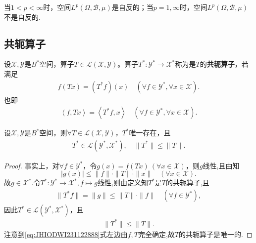 \documentclass[../../main.tex]{subfiles}%
\begin{document}
\begin{examples}
当$1<p<\infty$时，空间$L^p(\Omega,\mathscr{B},\mu)$是自反的；当$p=1,\infty$时，空间$L^p(\Omega,\mathscr{B},\mu)$不是自反的.
\end{examples}


\subsection{共轭算子}

\begin{definition}[共轭算子]
设$\mathscr{X},\mathscr{Y}$是$B^*$空间，算子$T\in\mathscr{L}(\mathscr{X},\mathscr{Y})$。算子$T^*:\mathscr{Y}^*\to\mathscr{X}^*$称为是$T$的\textbf{共轭算子}，若满足
\begin{align}\label{eq:JHIODWI231122888}
f(Tx)=(T^*f)(x)\quad (\forall f\in\mathscr{Y}^*,\forall x\in\mathscr{X}).
\end{align}
也即
\begin{align*}
\left< f,Tx \right> =\left< T^*f,x \right> \quad (\forall f\in \mathscr{Y} ^*,\forall x\in \mathscr{X} ).
\end{align*}
\end{definition}

\begin{proposition}
设$\mathscr{X},\mathscr{Y}$是$B^*$空间，则$\forall T\in\mathscr{L}(\mathscr{X},\mathscr{Y})$，$T^*$唯一存在，且
\begin{align}\label{eq:::HIOUR32s2.5.26}
T^*\in\mathscr{L}(\mathscr{Y}^*,\mathscr{X}^*),\quad \|T^*\|\leqslant\|T\|.
\end{align}
\end{proposition}
\begin{proof}

事实上，对$\forall f\in\mathscr{Y}^*$，令$g(x)=f(Tx)\ (\forall x\in\mathscr{X})$，则$g$线性,且由知
\[
|g(x)|\leqslant\|f\|\cdot\|T\|\cdot\|x\|\quad (\forall x\in\mathscr{X}).
\]
故$g\in\mathscr{X}^*$.令$T^*:\mathscr{Y}^*\to\mathscr{X}^*,f\mapsto g$线性,则由定义知$T^*$是$T$的共轭算子,且
\begin{align}
\|T^*f\|=\|g\|\leqslant\|T\|\cdot\|f\|\quad (\forall f\in\mathscr{Y}^*), \label{eq:::HIOUR32s2.5.25}
\end{align}
因此$T^*\in\mathscr{L}(\mathscr{Y}^*,\mathscr{X}^*)$，且
\begin{align*}
\|T^*\|\leqslant\|T\|. 
\end{align*}
注意到\eqref{eq:JHIODWI231122888}式左边由$f,T$完全确定,故$T$的共轭算子是唯一的.
\end{proof}
\end{document}
